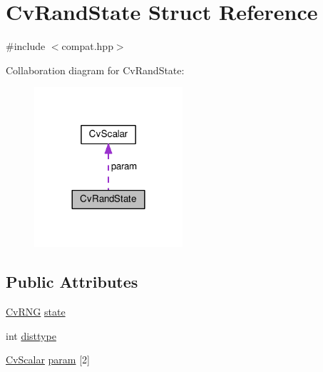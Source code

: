 \hypertarget{structCvRandState}{\section{Cv\-Rand\-State Struct Reference}
\label{structCvRandState}
}


{\ttfamily \#include $<$compat.\-hpp$>$}



Collaboration diagram for Cv\-Rand\-State\-:\nopagebreak
\begin{figure}[H]
\begin{center}
\leavevmode
\includegraphics[width=156pt]{structCvRandState__coll__graph}
\end{center}
\end{figure}
\subsection*{Public Attributes}
\begin{DoxyCompactItemize}
\item 
\hyperlink{core_2types__c_8h_a1a96e51ab3a372962769bb72b8ebb95d}{Cv\-R\-N\-G} \hyperlink{structCvRandState_a564c167b31ca5d5f3bb574d23127fcb5}{state}
\item 
int \hyperlink{structCvRandState_a250e3c9f5ba28d74aae2d21fbc13c812}{disttype}
\item 
\hyperlink{structCvScalar}{Cv\-Scalar} \hyperlink{structCvRandState_a57bd1e6afb134d7450af354cc1abd810}{param} \mbox{[}2\mbox{]}
\end{DoxyCompactItemize}


